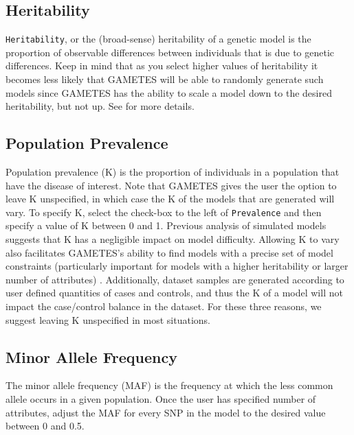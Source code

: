 \documentclass{report}
\begin{document}
\subsection{Heritability}
\texttt{Heritability}, or the (broad-sense) heritability of a genetic model is the proportion of observable differences between individuals that is due to genetic differences.  Keep in mind that as you select higher values of heritability it becomes less likely that GAMETES will be able to randomly generate such models since GAMETES has the ability to scale a model down to the desired heritability, but not up.  See \cite{urbanowicz2012gametes} for more details.  

\subsection{Population Prevalence}
Population prevalence (K) is the proportion of individuals in a population that have the disease of interest.  Note that GAMETES gives the user the option to leave K unspecified, in which case the K of the models that are generated will vary.  To specify K, select the check-box to the left of \texttt{Prevalence} and then specify a value of K between 0 and 1. Previous analysis of simulated models suggests that K has a negligible impact on model difficulty.  Allowing K to vary also facilitates GAMETES's ability to find models with a precise set of model constraints (particularly important for models with a higher heritability or larger number of attributes) \cite{urbanowicz2013classification}.  Additionally, dataset samples are generated according to user defined quantities of cases and controls, and thus the K of a model will not impact the case/control balance in the dataset.  For these three reasons, we suggest leaving K unspecified in most situations.

\subsection{Minor Allele Frequency}
The minor allele frequency (MAF) is the frequency at which the less common allele occurs in a given population.  Once the user has specified number of attributes, adjust the MAF for every SNP in the model to the desired value between 0 and 0.5.
\end{document}
